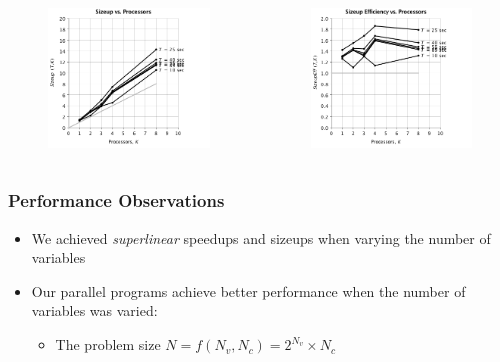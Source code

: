 \documentclass[handout,10pt]{beamer}
\begin{document}
\begin{frame}
\begin{columns}
\begin{minipage}[c][.6\textheight][c]{\linewidth}
	\begin{figure}
	\centering
	\includegraphics[scale = 0.25]{e_size_2.png}
	\end{figure}
	\vspace{-2em}
	\begin{figure}
	\centering
	\includegraphics[scale = 0.25]{e_size_1.png}
	\end{figure}
\end{minipage}
\end{columns}
\end{frame}

\begin{frame}
	\frametitle{Performance Observations}
	\begin{itemize}
		\item We achieved \emph{superlinear} speedups and sizeups when varying the number of variables
		\item Our parallel programs achieve better performance when the number of variables was varied:
		\begin{itemize}
			\item The problem size $N = f(N_v, N_c) = 2^{N_v} \times N_c$
		\end{itemize}
	\end{itemize}
\end{frame}
\end{document}

